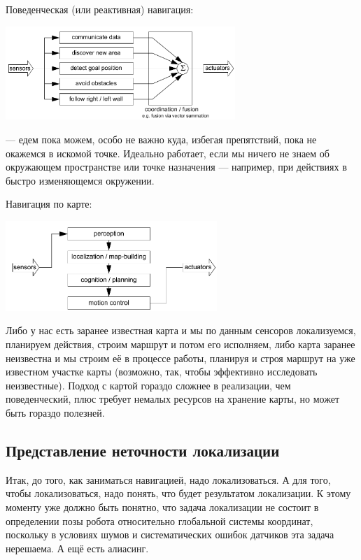 \documentclass{../../text-style}
\begin{document}
Поведенческая (или реактивная) навигация: 

\begin{center}
    \includegraphics[width=0.65\textwidth]{behaviorNavigation.png}
\end{center}

--- едем пока можем, особо не важно куда, избегая препятствий, пока не окажемся в искомой точке.
Идеально работает, если мы ничего не знаем об окружающем пространстве или точке назначения --- например, при действиях в быстро изменяющемся окружении.

Навигация по карте:

\begin{center}
    \includegraphics[width=0.6\textwidth]{mapBasedNavigation.png}
\end{center}

Либо у нас есть заранее известная карта и мы по данным сенсоров локализуемся, планируем действия, строим маршрут и потом его исполняем, либо карта заранее неизвестна и мы строим её в процессе работы, планируя и строя маршрут на уже известном участке карты (возможно, так, чтобы эффективно исследовать неизвестные).
Подход с картой гораздо сложнее в реализации, чем поведенческий, плюс требует немалых ресурсов на хранение карты, но может быть гораздо полезней.

\subsection{Представление неточности локализации}

Итак, до того, как заниматься навигацией, надо локализоваться.
А для того, чтобы локализоваться, надо понять, что будет результатом локализации.
К этому моменту уже должно быть понятно, что задача локализации не состоит в определении позы робота относительно глобальной системы координат, поскольку в условиях шумов и систематических ошибок датчиков эта задача нерешаема.
А ещё есть алиасинг.
\end{document}
